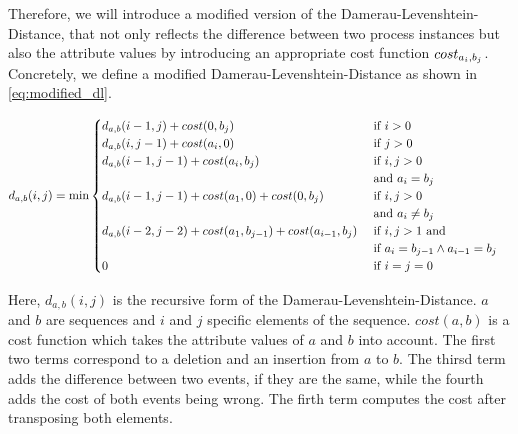 \documentclass[./../../paper.tex]{subfiles}
\begin{document}

\noindent Therefore, we will introduce a modified version of the Damerau-Levenshtein-Distance, that not only reflects the difference between two process instances but also the attribute values by introducing an appropriate cost function $cost_{a_i, b_j}$. Concretely, we define a modified Damerau-Levenshtein-Distance as shown in  \autoref{eq:modified_dl}.

\begin{align}
    \label{eq:modified_dl}
    d_{a, b}(i, j) & =\min
    \begin{cases}
        d_{a, b}(i-1, j  )+cost(0, b_j) & \text { if } i>0                                            \\
        d_{a, b}(i  , j-1)+cost(a_i, 0) & \text { if } j>0                                            \\
        d_{a, b}(i-1, j-1)+cost(a_i, b_j) & \text { if } i, j>0   \\ & \text { and } a_{i}=b_{j}                                       \\
        d_{a, b}(i-1, j-1)+cost(a_1, 0) + cost(0, b_j) & \text { if } i, j>0  \\ & \text { and } a_{i} \neq b_{j}                                       \\
        d_{a, b}(i-2, j-2)+cost(a_1, b_{j-1}) + cost(a_{i-1}, b_j) & \text { if } i, j>1 \text { and } \\ 
        & \text { if } a_{i}=b_{j-1} \land a_{i-1}=b_{j} \\
        0                                 & \text { if } i=j=0                                          
    \end{cases} 
\end{align}

\noindent Here, $d_{a, b}(i, j)$ is the recursive form of the Damerau-Levenshtein-Distance. $a$ and $b$ are sequences and $i$ and $j$ specific elements of the sequence. $cost(a,b)$ is a cost function which takes the attribute values of $a$ and $b$ into account. The first two terms correspond to a deletion and an insertion from $a$ to $b$. The thirsd term adds the difference between two events, if they are the same, while the fourth adds the cost of both events being wrong. The firth term computes the cost after transposing both elements.
\end{document}
